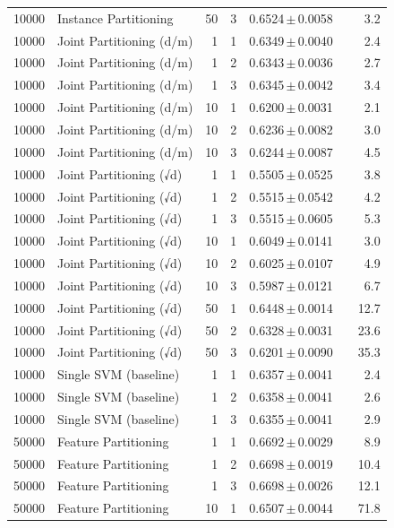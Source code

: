 \begin{table}[ht]
\begin{tabular}{rlrrccr}
10000 & Instance Partitioning & 50 & 3 & 0.6524\,$\pm$\,0.0058 &  & 3.2 \\
10000 & Joint Partitioning (d/m) & 1 & 1 & 0.6349\,$\pm$\,0.0040 &  & 2.4 \\
10000 & Joint Partitioning (d/m) & 1 & 2 & 0.6343\,$\pm$\,0.0036 &  & 2.7 \\
10000 & Joint Partitioning (d/m) & 1 & 3 & 0.6345\,$\pm$\,0.0042 &  & 3.4 \\
10000 & Joint Partitioning (d/m) & 10 & 1 & 0.6200\,$\pm$\,0.0031 &  & 2.1 \\
10000 & Joint Partitioning (d/m) & 10 & 2 & 0.6236\,$\pm$\,0.0082 &  & 3.0 \\
10000 & Joint Partitioning (d/m) & 10 & 3 & 0.6244\,$\pm$\,0.0087 &  & 4.5 \\
10000 & Joint Partitioning (√d) & 1 & 1 & 0.5505\,$\pm$\,0.0525 &  & 3.8 \\
10000 & Joint Partitioning (√d) & 1 & 2 & 0.5515\,$\pm$\,0.0542 &  & 4.2 \\
10000 & Joint Partitioning (√d) & 1 & 3 & 0.5515\,$\pm$\,0.0605 &  & 5.3 \\
10000 & Joint Partitioning (√d) & 10 & 1 & 0.6049\,$\pm$\,0.0141 &  & 3.0 \\
10000 & Joint Partitioning (√d) & 10 & 2 & 0.6025\,$\pm$\,0.0107 &  & 4.9 \\
10000 & Joint Partitioning (√d) & 10 & 3 & 0.5987\,$\pm$\,0.0121 &  & 6.7 \\
10000 & Joint Partitioning (√d) & 50 & 1 & 0.6448\,$\pm$\,0.0014 &  & 12.7 \\
10000 & Joint Partitioning (√d) & 50 & 2 & 0.6328\,$\pm$\,0.0031 &  & 23.6 \\
10000 & Joint Partitioning (√d) & 50 & 3 & 0.6201\,$\pm$\,0.0090 &  & 35.3 \\
10000 & Single SVM (baseline) & 1 & 1 & 0.6357\,$\pm$\,0.0041 &  & 2.4 \\
10000 & Single SVM (baseline) & 1 & 2 & 0.6358\,$\pm$\,0.0041 &  & 2.6 \\
10000 & Single SVM (baseline) & 1 & 3 & 0.6355\,$\pm$\,0.0041 &  & 2.9 \\
50000 & Feature Partitioning & 1 & 1 & 0.6692\,$\pm$\,0.0029 &  & 8.9 \\
50000 & Feature Partitioning & 1 & 2 & 0.6698\,$\pm$\,0.0019 &  & 10.4 \\
50000 & Feature Partitioning & 1 & 3 & 0.6698\,$\pm$\,0.0026 &  & 12.1 \\
50000 & Feature Partitioning & 10 & 1 & 0.6507\,$\pm$\,0.0044 &  & 71.8 \\

\end{tabular}
\end{table}
